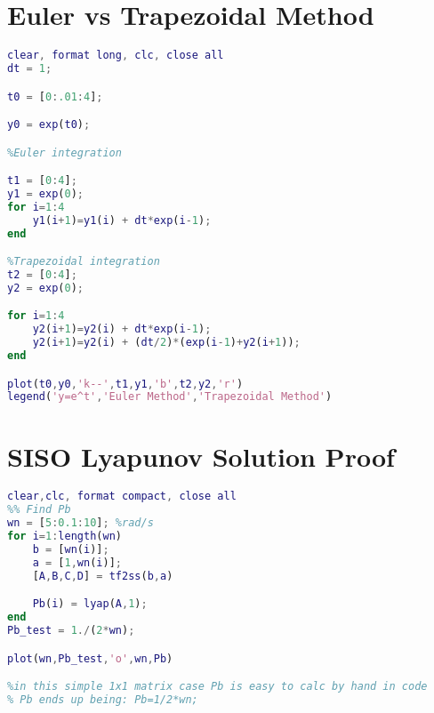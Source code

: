 \section{Euler vs Trapezoidal Method}
\begin{lstlisting}[language=matlab]
clear, format long, clc, close all
dt = 1;

t0 = [0:.01:4];

y0 = exp(t0);

%Euler integration

t1 = [0:4];
y1 = exp(0);
for i=1:4
    y1(i+1)=y1(i) + dt*exp(i-1);
end

%Trapezoidal integration
t2 = [0:4];
y2 = exp(0);

for i=1:4
    y2(i+1)=y2(i) + dt*exp(i-1);
    y2(i+1)=y2(i) + (dt/2)*(exp(i-1)+y2(i+1));
end

plot(t0,y0,'k--',t1,y1,'b',t2,y2,'r')
legend('y=e^t','Euler Method','Trapezoidal Method')
\end{lstlisting}

\section{SISO Lyapunov Solution Proof}
\begin{lstlisting}[language=matlab]
clear,clc, format compact, close all
%% Find Pb
wn = [5:0.1:10]; %rad/s
for i=1:length(wn)
    b = [wn(i)];
    a = [1,wn(i)];
    [A,B,C,D] = tf2ss(b,a)

    Pb(i) = lyap(A,1);
end
Pb_test = 1./(2*wn);

plot(wn,Pb_test,'o',wn,Pb)

%in this simple 1x1 matrix case Pb is easy to calc by hand in code
% Pb ends up being: Pb=1/2*wn;
\end{lstlisting}

